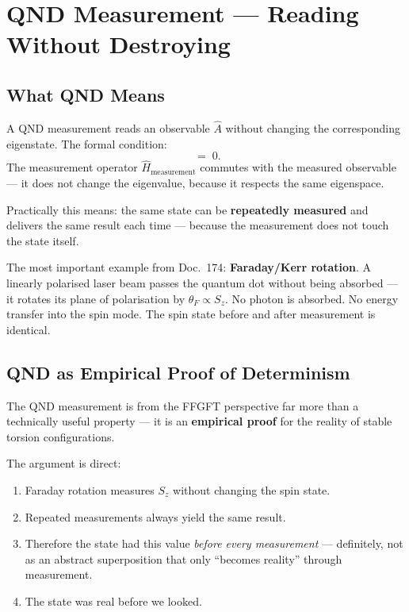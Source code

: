 \section{QND Measurement --- Reading Without Destroying}
\label{sec:qnd}

\subsection{What QND Means}

A QND measurement reads an observable $\hat{A}$
without changing the corresponding eigenstate.
The formal condition:
\begin{equation}
  [\hat{A},\; \hat{H}_\text{measurement}] \;=\; 0.
\end{equation}
The measurement operator $\hat{H}_\text{measurement}$ commutes
with the measured observable --- it does not change the
eigenvalue, because it respects the same eigenspace.

Practically this means: the same state can be
\textbf{repeatedly measured} and delivers
the same result each time --- because the measurement
does not touch the state itself.

The most important example from Doc.~174:
\textbf{Faraday/Kerr rotation}.
A linearly polarised laser beam passes the
quantum dot without being absorbed ---
it rotates its plane of polarisation by $\theta_F \propto S_z$.
No photon is absorbed. No energy transfer
into the spin mode. The spin state before and after
measurement is identical.

\subsection{QND as Empirical Proof of Determinism}
\label{sec:qnd-proof}

The QND measurement is from the FFGFT perspective far more
than a technically useful property ---
it is an \textbf{empirical proof}
for the reality of stable torsion configurations.

The argument is direct:

\begin{enumerate}
  \item Faraday rotation measures $S_z$ without
    changing the spin state.
  \item Repeated measurements always yield the same result.
  \item Therefore the state had this value
    \emph{before every measurement} --- definitely,
    not as an abstract superposition that only
    ``becomes reality'' through measurement.
  \item The state was real before we looked.
\end{enumerate}

